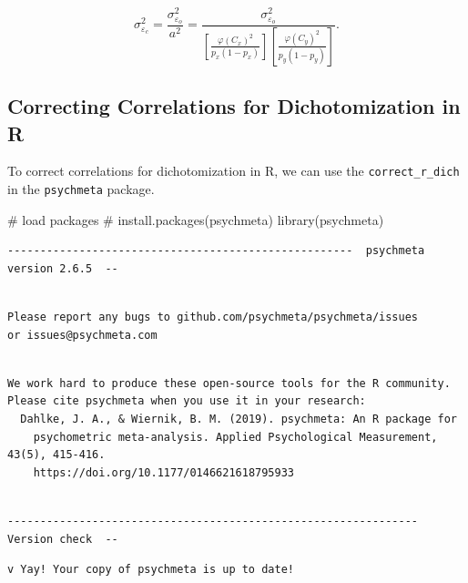 \documentclass[
  letterpaper,
  DIV=11,
  numbers=noendperiod]{scrreprt}
\newenvironment{Shaded}{\begin{snugshade}}{\end{snugshade}}
\newcommand{\CommentTok}[1]{\textcolor[rgb]{0.37,0.37,0.37}{#1}}
\newcommand{\FunctionTok}[1]{\textcolor[rgb]{0.28,0.35,0.67}{#1}}
\newcommand{\NormalTok}[1]{\textcolor[rgb]{0.00,0.23,0.31}{#1}}
\begin{document}
\[
\sigma^2_{\varepsilon_c} =\frac{\sigma^2_{\varepsilon_o}} {a^2} =\frac{\sigma^2_{\varepsilon_o}} {\left[\frac{\varphi(C_x)^2}{p_x(1-p_x)} \right]\left[\frac{\varphi(C_y)^2}{p_y(1-p_y)} \right]}.
\]

\hypertarget{correcting-correlations-for-dichotomization-in-r}{%
\subsection{Correcting Correlations for Dichotomization in
R}\label{correcting-correlations-for-dichotomization-in-r}}

To correct correlations for dichotomization in R, we can use the
\texttt{correct\_r\_dich} in the \texttt{psychmeta} package.

\begin{Shaded}
\begin{Highlighting}[]
\CommentTok{\# load packages}
\CommentTok{\# install.packages(\textquotesingle{}psychmeta\textquotesingle{})}
\FunctionTok{library}\NormalTok{(psychmeta)}
\end{Highlighting}
\end{Shaded}

\begin{verbatim}
-----------------------------------------------------  psychmeta version 2.6.5  --
\end{verbatim}

\begin{verbatim}

Please report any bugs to github.com/psychmeta/psychmeta/issues
or issues@psychmeta.com
\end{verbatim}

\begin{verbatim}

We work hard to produce these open-source tools for the R community.
Please cite psychmeta when you use it in your research:
  Dahlke, J. A., & Wiernik, B. M. (2019). psychmeta: An R package for
    psychometric meta-analysis. Applied Psychological Measurement, 43(5), 415-416.
    https://doi.org/10.1177/0146621618795933
\end{verbatim}

\begin{verbatim}

---------------------------------------------------------------  Version check  --
\end{verbatim}

\begin{verbatim}
v Yay! Your copy of psychmeta is up to date!
\end{verbatim}
\end{document}
